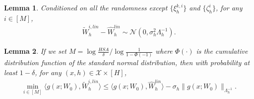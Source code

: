 \documentclass{article} \usepackage{iclr2023/iclr2023_conference,times}
\newtheorem{lemma}{Lemma}[section]
\begin{document}
\begin{lemma}
Conditioned on all the randomness except $\{\xi^{k,i}_h\}$ and $\{\zeta^i_h \}$, for any $i \in [M]$,
\begin{align*}
    \tilde{W}^{i,lin}_h - \hat{W}^{lin}_h \sim \mathcal{N}(0, \sigma^2_h \Lambda_h^{-1}). 
\end{align*}
\label{Lemma: perturbed ERM minus non-perturbed ERM follows a Gaussian}
\end{lemma}



\begin{lemma}
If we set $M = \log \frac{HSA}{\delta} / \log \frac{1}{1 - \Phi(-1)}$ where $\Phi(\cdot)$ is the cumulative distribution function of the standard normal distribution, then with probability at least $1 - \delta$, for any $(x,h) \in \mathcal{X} \times [H]$,  
\begin{align*}
     \min_{i \in [M]} \langle g(x; W_0), \tilde{W}^{i,lin}_h \rangle \leq \langle  g(x; W_0), \hat{W}_h^{lin} \rangle - \sigma_h \|  g(x; W_0)\|_{\Lambda_h^{-1}}. 
\end{align*}
\label{lemma: anti-concentration for proxy linear MDP}
\end{lemma}
\end{document}
